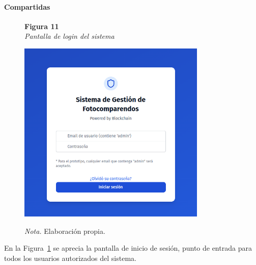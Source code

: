 \paragraph{Compartidas}
 \begin{figure}[htbp]
    \begin{flushleft}
        \textbf{Figura 11}\\[2em]
        \textit{Pantalla de login del sistema}
    \end{flushleft}
    \vspace{1em}
    \centering
    \includegraphics[width=0.8\textwidth]{Images/UI1.png}
    \vspace{2em}
    \begin{flushleft}
        \textit{Nota.} Elaboración propia.
    \end{flushleft}
    \label{fig:login}
\end{figure}

En la Figura~\ref{fig:login} se aprecia la pantalla de inicio de sesión, punto de entrada para todos los usuarios autorizados del sistema.

